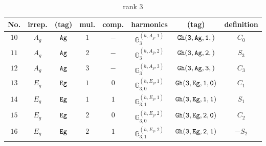 \documentclass[fleqn,8pt]{jsarticle}
\begin{document}
\begin{table}[ht!]
\begin{center}
\caption{rank 3}
\renewcommand{\arraystretch}{1.3}
\begin{tabular}{cccccccc} \hline \hline
No. & irrep. & (tag) & mul. & comp. & harmonics & (tag) & definition \\ \hline
$ 10 $ & $ A_{g} $ & $ {\tt Ag} $ & $ 1 $ & $ - $ & $ \mathbb{G}_{3}^{(h,A_{g},1)} $ & $ {\tt Gh(3,Ag,1,)} $ & $ C_{0} $ \\
$ 11 $ & $ A_{g} $ & $ {\tt Ag} $ & $ 2 $ & $ - $ & $ \mathbb{G}_{3}^{(h,A_{g},2)} $ & $ {\tt Gh(3,Ag,2,)} $ & $ S_{3} $ \\
$ 12 $ & $ A_{g} $ & $ {\tt Ag} $ & $ 3 $ & $ - $ & $ \mathbb{G}_{3}^{(h,A_{g},3)} $ & $ {\tt Gh(3,Ag,3,)} $ & $ C_{3} $ \\
$ 13 $ & $ E_{g} $ & $ {\tt Eg} $ & $ 1 $ & $ 0 $ & $ \mathbb{G}_{3,0}^{(h,E_{g},1)} $ & $ {\tt Gh(3,Eg,1,0)} $ & $ C_{1} $ \\
$ 14 $ & $ E_{g} $ & $ {\tt Eg} $ & $ 1 $ & $ 1 $ & $ \mathbb{G}_{3,1}^{(h,E_{g},1)} $ & $ {\tt Gh(3,Eg,1,1)} $ & $ S_{1} $ \\
$ 15 $ & $ E_{g} $ & $ {\tt Eg} $ & $ 2 $ & $ 0 $ & $ \mathbb{G}_{3,0}^{(h,E_{g},2)} $ & $ {\tt Gh(3,Eg,2,0)} $ & $ C_{2} $ \\
$ 16 $ & $ E_{g} $ & $ {\tt Eg} $ & $ 2 $ & $ 1 $ & $ \mathbb{G}_{3,1}^{(h,E_{g},2)} $ & $ {\tt Gh(3,Eg,2,1)} $ & $ - S_{2} $ \\
 \hline \hline
\end{tabular}
\end{center}
\end{table}
\end{document}
